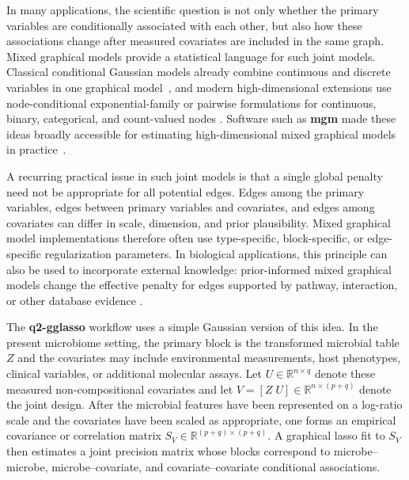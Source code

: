 \documentclass[11pt,a4paper]{article}
\newcommand{\pkg}[1]{\textbf{#1}}
\newcommand{\R}{\mathbb{R}}
\begin{document}
In many applications, the scientific question is not only whether the primary
variables are conditionally associated with each other, but also how these
associations change after measured covariates are included in the same graph.
Mixed graphical models provide a statistical language for such joint models.
Classical conditional Gaussian models already combine continuous and discrete
variables in one graphical model~\citep{lauritzen1996graphical}, and modern
high-dimensional extensions use node-conditional exponential-family or pairwise
formulations for continuous, binary, categorical, and count-valued nodes
\citep{yang2015graphical,lee2015learning,chen2015selection,cheng2017high}.
Software such as \pkg{mgm} made these ideas broadly accessible for estimating
high-dimensional mixed graphical models in practice~\citep{haslbeck2020mgm}.

A recurring practical issue in such joint models is that a single global penalty
need not be appropriate for all potential edges. Edges among the primary
variables, edges between primary variables and covariates, and edges among
covariates can differ in scale, dimension, and prior plausibility. Mixed
graphical model implementations therefore often use type-specific,
block-specific, or edge-specific regularization parameters. In biological
applications, this principle can also be used to incorporate external knowledge:
prior-informed mixed graphical models change the effective penalty for edges
supported by pathway, interaction, or other database evidence
\citep{manatakis2018pimgm}.

The \pkg{q2-gglasso} workflow uses a simple Gaussian version of this idea. In the
present microbiome setting, the primary block is the transformed microbial table
$Z$ and the covariates may include environmental measurements, host phenotypes,
clinical variables, or additional molecular assays. Let
$U\in\R^{n\times q}$ denote these measured non-compositional covariates and let
$V=[Z\; U]\in\R^{n\times(p+q)}$ denote the joint design. After the microbial
features have been represented on a log-ratio scale and the covariates have been
scaled as appropriate, one forms an empirical covariance or correlation matrix
$S_V\in\R^{(p+q)\times(p+q)}$. A graphical lasso fit to $S_V$ then estimates a
joint precision matrix whose blocks correspond to microbe--microbe,
microbe--covariate, and covariate--covariate conditional associations.
\end{document}
